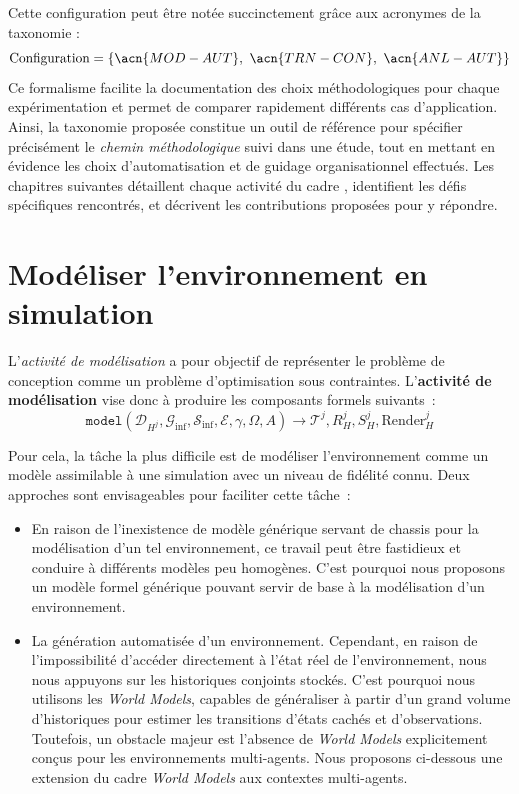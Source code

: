 Cette configuration peut être notée succinctement grâce aux acronymes de la taxonomie :
\[
  \text{Configuration} = \{\acn{MOD-AUT},\ \acn{TRN-CON},\ \acn{ANL-AUT}\}
\]
Ce formalisme facilite la documentation des choix méthodologiques pour chaque expérimentation et permet de comparer rapidement différents cas d'application.
%
Ainsi, la taxonomie proposée constitue un outil de référence pour spécifier précisément le \textit{chemin méthodologique} suivi dans une étude, tout en mettant en évidence les choix d'automatisation et de guidage organisationnel effectués.
Les chapitres suivantes détaillent chaque activité du cadre , identifient les défis spécifiques rencontrés, et décrivent les contributions proposées pour y répondre.


\clearpage
\thispagestyle{empty}
\null
\newpage


\chapter{Modéliser l'environnement en simulation}
\label{chap:modelling}

\noindent L'\textit{activité de modélisation} a pour objectif de représenter le problème de conception comme un problème d'optimisation sous contraintes. L'\textbf{activité de modélisation} vise donc à produire les composants formels suivants~:
\begin{displaymath}
  \texttt{model}(\mathcal{D}_{H^j}, \mathcal{G}_{\text{inf}}, \mathcal{S}_{\text{inf}}, \mathcal{E}, \gamma, \Omega, A) \rightarrow \mathcal{T}^j, R^j_H, S^j_H, \text{Render}^j_H
\end{displaymath}

\noindent Pour cela, la tâche la plus difficile est de modéliser l'environnement comme un modèle assimilable à une simulation avec un niveau de fidélité connu. Deux approches sont envisageables pour faciliter cette tâche~:
\begin{itemize}
  \item En raison de l'inexistence de modèle générique servant de chassis pour la modélisation d'un tel environnement, ce travail peut être fastidieux et conduire à différents modèles peu homogènes. C'est pourquoi nous proposons un modèle formel générique pouvant servir de base à la modélisation d'un environnement.
  \item La génération automatisée d'un environnement. Cependant, en raison de l'impossibilité d'accéder directement à l'état réel de l'environnement, nous nous appuyons sur les historiques conjoints stockés. C'est pourquoi nous utilisons les \textit{World Models}, capables de généraliser à partir d'un grand volume d'historiques pour estimer les transitions d'états cachés et d'observations. Toutefois, un obstacle majeur est l'absence de \textit{World Models} explicitement conçus pour les environnements multi-agents. Nous proposons ci-dessous une extension du cadre \textit{World Models} aux contextes multi-agents.
\end{itemize}

